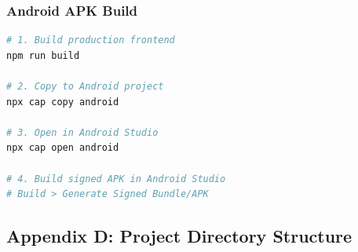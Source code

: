 \subsubsection*{Android APK Build}
\begin{lstlisting}[language=bash, caption={Android Build Commands}]
# 1. Build production frontend
npm run build

# 2. Copy to Android project
npx cap copy android

# 3. Open in Android Studio
npx cap open android

# 4. Build signed APK in Android Studio
# Build > Generate Signed Bundle/APK
\end{lstlisting}

\newpage
\subsection*{Appendix D: Project Directory Structure}

